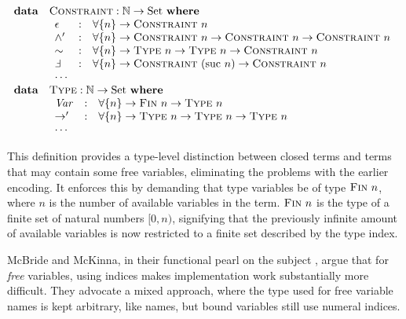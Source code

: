 \documentclass[a4paper]{jfp}
\begin{document}
\begin{displaymath}   
	\begin{array}{ll}
		\textbf{data} & \textsc{Constraint} : \mathbb{N} \rightarrow \text{Set}\ \textbf{where} \\
		              & \begin{array}{lcl}
                         \epsilon & : & \forall \{ n \} \rightarrow \textsc{Constraint}\ n \\
						 \land'   & : & \forall \{ n \} \rightarrow \textsc{Constraint}\ n \rightarrow \textsc{Constraint}\ n \rightarrow \textsc{Constraint}\ n \\
						 \sim     & : & \forall \{ n \} \rightarrow \textsc{Type}\ n \rightarrow \textsc{Type}\ n \rightarrow \textsc{Constraint}\ n \\
						 \Finv    & : & \forall \{ n \} \rightarrow \textsc{Constraint}\ (\text{suc}\ n) \rightarrow \textsc{Constraint}\ n \\
						 \cdots \\
					    \end{array} \\
		\textbf{data} & \textsc{Type} : \mathbb{N} \rightarrow \text{Set}\ \textbf{where} \\
		              & \begin{array}{lcl}
                         \mathit{Var} & : & \forall \{ n \} \rightarrow \textsc{Fin}\ n \rightarrow \textsc{Type}\ n \\
						 \rightarrow' & : & \forall \{ n \} \rightarrow \textsc{Type}\ n \rightarrow \textsc{Type}\ n \rightarrow \textsc{Type}\ n \\
						 \cdots \\
					    \end{array} \\						
     \end{array}
\end{displaymath}	 

This definition provides a type-level distinction between closed terms and terms that may contain some free variables, eliminating the problems with the earlier encoding. It enforces this by demanding that type variables be of type $\textsc{Fin}\ n$, where $n$ is the number of available variables in the term. $\textsc{Fin}\ n$ is the type of a finite set of natural numbers $[0,n)$, signifying that the previously infinite amount of available variables is now restricted to a finite set described by the type index.
 
McBride and McKinna, in their functional pearl on the subject \cite{McBride:2004:FPI:1017472.1017477}, argue that for \emph{free} variables, using indices makes implementation work substantially more difficult. They advocate a mixed approach, where the type used for free variable names is kept arbitrary, like names, but bound variables still use numeral indices. 
\end{document}
